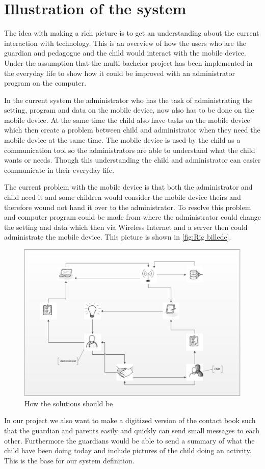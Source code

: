 \section{Illustration of the system}
The idea with making a rich picture is to get an understanding about the current interaction with technology. This is an overview of how the users who are the guardian and pedagogue and the child would interact with the mobile device. Under the assumption that the multi-bachelor project has been implemented in the everyday life to show how it could be improved with an administrator program on the computer.

In the current system the administrator who has the task of administrating the setting, program and data on the mobile device, now also has to be done on the mobile device. At the same time the child also have tasks on the mobile device which then create a problem between child and administrator when they need the mobile device at the same time. The mobile device is used by the child as a communication tool so the administrators are able to understand what the child wants or needs. Though this understanding the child and administrator can easier communicate in their everyday life.

The current problem with the mobile device is that both the administrator and child need it and some children would consider the mobile device theirs and therefore wound not hand it over to the administrator. To resolve this problem and computer program could be made from where the administrator could change the setting and data which then via Wireless Internet and a server then could administrate the mobile device. This picture is shown in \vref{fig:Rig billede}. 

\begin{figure}[ht]
	\centering
		\includegraphics[width=1.00\textwidth]{img/Rig_billede.jpg}
	\caption{How the solutions should be}
	\label{fig:Rig billede}
\end{figure}

In our project we also want to make a digitized version of the contact book such that the guardian and parents easily and quickly can send small messages to each other. Furthermore the guardians would be able to send a summary of what the child have been doing today and include pictures of the child doing an activity. This is the base for our system definition.    